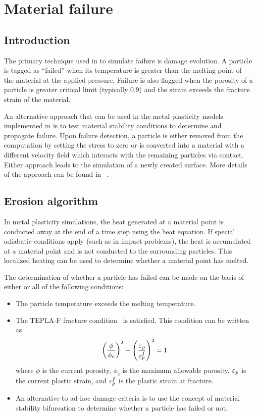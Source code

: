 \chapter{Material failure}

\section{Introduction}
The primary technique used in \Vaango to simulate failure is damage evolution.
A particle is tagged as ``failed'' when its temperature is greater than the
melting point of the material at the applied pressure.  Failure is also 
flagged when the porosity of a particle is greater critical limit (typically 0.9)
and the strain exceeds the fracture strain of the material.  

An alternative approach that can be used in the metal plasticity models
implemented in \Vaango is to test material stability conditions 
to determine and propagate failure.  Upon failure detection,
a particle is either removed from the computation by setting the stress to
zero or is converted into a material with a different velocity field 
which interacts with the remaining particles via contact.  Either approach
leads to the simulation of a newly created surface.  More details of the
approach can be found in ~\cite{Banerjee2004a,Banerjee2004c,Banerjee2005}.

\section{Erosion algorithm}
In metal plasticity simulations, the heat generated at a material point is conducted 
away at the end of a time step using the heat equation.  If special adiabatic 
conditions apply (such as in impact problems), the heat is accumulated at a 
material point and is not conducted to the surrounding particles.  This 
localized heating can be used to determine whether a material point has
melted.

The determination of whether a particle has failed can be made on the 
basis of either or all of the following conditions:
\begin{itemize}
  \item The particle temperature exceeds the melting temperature.
  \item The TEPLA-F fracture condition~\cite{Johnson1988} is satisfied.
     This condition can be written as
     \begin{equation}
       \left(\frac{\phi}{\phi_c}\right)^2 + 
       \left(\frac{\varepsilon_p}{\varepsilon_p^f}\right)^2 = 1
     \end{equation}
     where $\phi$ is the current porosity, $\phi_c$ is the maximum 
     allowable porosity, $\varepsilon_p$ is the current plastic strain, and
     $\varepsilon_p^f$ is the plastic strain at fracture.
  \item An alternative to ad-hoc damage criteria is to use the concept of 
     material stability bifurcation to determine whether a particle has 
     failed or not.
\end{itemize}

